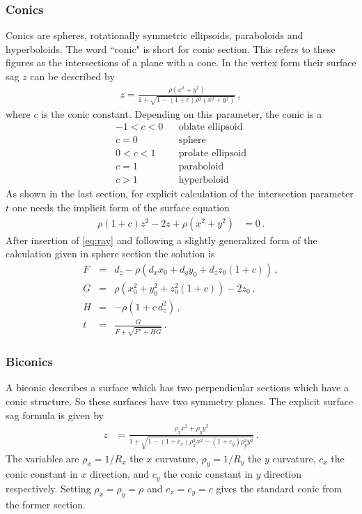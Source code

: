 \documentclass[12pt,a4paper,twoside,openright,BCOR10mm,headsepline,titlepage,abstracton,chapterprefix,final]{scrreprt}
\begin{document}
\subsubsection{Conics}
Conics are spheres, rotationally symmetric ellipsoids, paraboloids and hyperboloids.
The word ``conic" is short for conic section. This refers to these figures as the
intersections of a plane with a cone.
In the vertex form their surface sag $z$ can be described by
\begin{eqnarray}
 z =  \frac
 { \rho ( x^2 + y^2 ) }
 { 1 + \sqrt{1 - (1+c) \rho^2  (x^2 + y^2)} }\,,
\end{eqnarray}
where $c$ is the conic constant. Depending on this parameter, the conic is a
\begin{eqnarray*}
-1 < c < 0 && \textrm{oblate ellipsoid} \\
     c = 0 && \textrm{sphere} \\
 0 < c < 1 && \textrm{prolate ellipsoid} \\
     c = 1 && \textrm{paraboloid} \\
     c > 1 && \textrm{hyperboloid}
\end{eqnarray*}
As shown in the last section, for explicit calculation of the intersection parameter $t$ one
needs the implicit form of the surface equation
\begin{align}
 \rho (1 + c) z^2 - 2 z + \rho (x^2 + y^2) &=0\,.
\end{align}
After insertion of \eqref{eq:ray} and following a slightly generalized form of the calculation
given in sphere section the solution is
\begin{subequations}
\label{eq:intersectionconicsection}
\begin{eqnarray}
   F &=& d_z - \rho \left( d_x x_0 + d_y y_0 + d_z z_0 (1+c) \right)\,, \\
   G &=& \rho (x_0^2 + y_0^2 + z_0^2 (1+c)) - 2 z_0\,, \\
   H &=& - \rho ( 1 + c \, d_z^2 )\,, \\
   t &=& \frac{G}{ F + \sqrt{F^2 + H G} }\,.
\end{eqnarray}
\end{subequations}

\subsubsection{Biconics}
A biconic describes a surface which has two perpendicular sections
which have a conic structure. So these surfaces have two symmetry planes.
The explicit surface sag formula is given by
\begin{align}
 z &= \frac{\rho_x x^2 + \rho_y y^2}{1 + \sqrt{1 - (1+c_x) \rho_x^2 x^2 - (1+c_y) \rho_y^2 y^2}} \label{eq:biconic}\,.
\end{align}
The variables are $\rho_x = 1/R_x$ the $x$ curvature, $\rho_y = 1/R_y$ the $y$ curvature, $c_x$ the conic constant in $x$ direction,
and $c_y$ the conic constant in $y$ direction respectively. Setting $\rho_x = \rho_y = \rho$ and $c_x = c_y = c$ gives
the standard conic from the former section.
\end{document}
